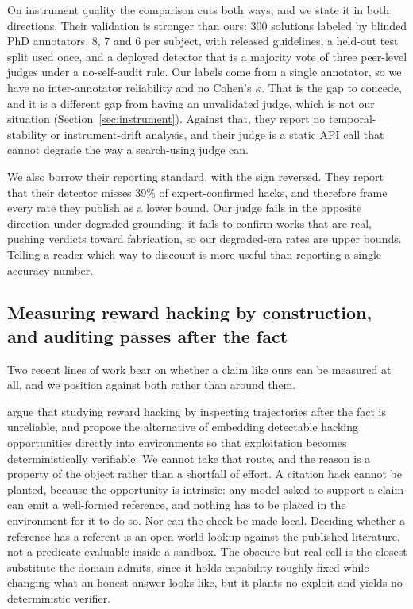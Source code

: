 On instrument quality the comparison cuts both ways, and we state it in both
directions. Their validation is stronger than ours: 300 solutions labeled by blinded
PhD annotators, 8, 7 and 6 per subject, with released guidelines, a held-out
test split used once, and a deployed detector that is a majority vote of three
peer-level judges under a no-self-audit rule. Our labels come from a single
annotator, so we have no inter-annotator reliability and no Cohen's $\kappa$.
That is the gap to concede, and it is a different gap from having an unvalidated
judge, which is not our situation (Section~\ref{sec:instrument}). Against that,
they report no temporal-stability or instrument-drift analysis, and their judge
is a static API call that cannot degrade the way a search-using judge can.

We also borrow their reporting standard, with the sign reversed. They report
that their detector misses 39\% of expert-confirmed hacks, and therefore frame
every rate they publish as a lower bound. Our judge fails in the opposite
direction under degraded grounding: it fails to confirm works that are real,
pushing verdicts toward fabrication, so our degraded-era rates are upper bounds.
Telling a reader which way to discount is more useful than reporting a single
accuracy number.

\subsection{Measuring reward hacking by construction, and auditing passes after the fact}


Two recent lines of work bear on whether a claim like ours can be measured at
all, and we position against both rather than around them.

\citet{roth2026hackverifiable} argue that studying reward hacking by inspecting
trajectories after the fact is unreliable, and propose the alternative of
embedding detectable hacking opportunities directly into environments so that
exploitation becomes deterministically verifiable. We cannot take that route,
and the reason is a property of the object rather than a shortfall of effort. A
citation hack cannot be planted, because the opportunity is intrinsic: any model
asked to support a claim can emit a well-formed reference, and nothing has to be
placed in the environment for it to do so. Nor can the check be made local.
Deciding whether a reference has a referent is an open-world lookup against the
published literature, not a predicate evaluable inside a sandbox. The
obscure-but-real cell is the closest substitute the domain admits, since it
holds capability roughly fixed while changing what an honest answer looks like,
but it plants no exploit and yields no deterministic verifier.

